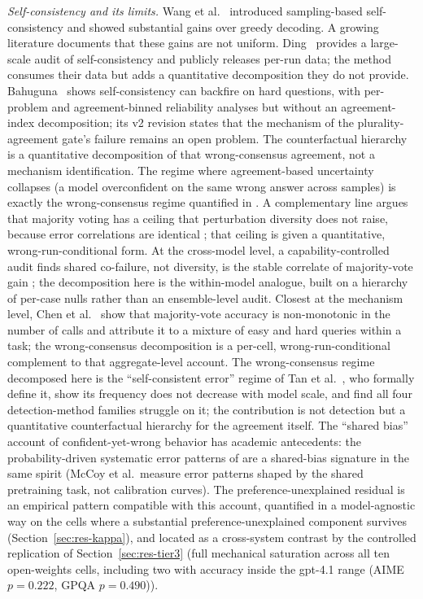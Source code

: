 \documentclass[a4paper,fleqn]{cas-sc}
\begin{document}
\emph{Self-consistency and its limits.}
Wang et al.~\cite{wang2022selfconsistency} introduced sampling-based
self-consistency and showed substantial gains over greedy decoding. A
growing literature documents that these gains are not uniform.
Ding~\cite{ding2026auditing} provides a large-scale audit of self-consistency and publicly releases per-run data; the method consumes their data but adds a quantitative decomposition they do not provide.
Bahuguna~\cite{bahuguna2026when} shows self-consistency can
backfire on hard questions, with per-problem and agreement-binned
reliability analyses but without an agreement-index decomposition; its v2 revision states that the mechanism of the plurality-agreement gate's failure remains an open problem. The counterfactual hierarchy is a quantitative decomposition of that wrong-consensus agreement, not a mechanism identification. The regime where agreement-based uncertainty collapses (a model overconfident on the same wrong answer across samples) is exactly the wrong-consensus regime quantified in \cite{hamidieh2026}. A complementary line argues that majority voting has a ceiling that perturbation diversity does not raise, because error correlations are identical \cite{fadnavis2026}; that ceiling is given a quantitative, wrong-run-conditional form. At the cross-model level, a capability-controlled audit finds shared co-failure, not diversity, is the stable correlate of majority-vote gain \cite{kim2026}; the decomposition here is the within-model analogue, built on a hierarchy of per-case nulls rather than an ensemble-level audit. Closest at the mechanism level, Chen et al.~\cite{chen2024} show that majority-vote accuracy is non-monotonic in the number of calls and attribute it to a mixture of easy and hard queries within a task; the wrong-consensus decomposition is a per-cell, wrong-run-conditional complement to that aggregate-level account. The wrong-consensus regime decomposed here is the ``self-consistent error'' regime of Tan et al.~\cite{tan2025}, who formally define it, show its frequency does not decrease with model scale, and find all four detection-method families struggle on it; the contribution is not detection but a quantitative counterfactual hierarchy for the agreement itself. The ``shared bias'' account of
confident-yet-wrong behavior has academic antecedents: the probability-driven systematic error patterns of \cite{mccoy2024} are a shared-bias signature in the same spirit (McCoy et al.\ measure error patterns shaped by the shared pretraining task, not calibration curves). The preference-unexplained residual is an empirical pattern compatible with this account, quantified in a model-agnostic way
on the cells where a substantial
preference-unexplained component survives (Section~\ref{sec:res-kappa}),
and located as a cross-system contrast by the controlled replication of
Section~\ref{sec:res-tier3} (full mechanical saturation across
all ten open-weights cells, including two with accuracy inside the gpt-4.1 range
(AIME $p=0.222$, GPQA $p=0.490$)).
\end{document}
